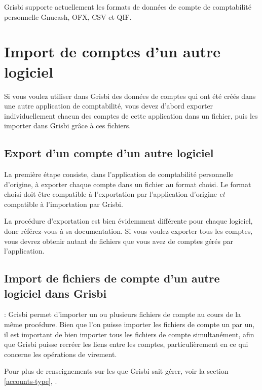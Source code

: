 Grisbi supporte actuellement les formats de données de compte de comptabilité personnelle \gls{Gnucash}, \gls{OFX}, \gls{CSV} et \gls{QIF}.


\section{Import de comptes d'un autre logiciel\label{move-import}}


Si vous voulez utiliser dans Grisbi des données de comptes qui ont été créés dans une autre application de comptabilité, vous devez d'abord exporter individuellement chacun des comptes de cette application dans un fichier, puis les importer dans Grisbi grâce à ces fichiers.


\subsection{Export d'un compte d'un autre logiciel\label{move-import-exportinit}}

La première étape consiste, dans l'application de comptabilité personnelle d'origine, à exporter chaque compte dans un fichier au format choisi. Le format choisi doit être compatible à l'exportation par l'application d'origine \emph{et} compatible à l'importation par Grisbi.

La procédure d'exportation est bien évidemment différente pour chaque logiciel, donc référez-vous à sa documentation. Si vous voulez exporter tous les comptes, vous devrez obtenir autant de fichiers que vous avez de comptes gérés par l'application.


\subsection{Import de fichiers de compte d'un autre logiciel dans Grisbi\label{move-import-importinit}}

\Note{}: Grisbi permet d'importer un ou plusieurs fichiers de compte au cours de la même procédure. Bien que l'on puisse importer les fichiers de compte un par un, il est important de bien importer tous les fichiers de compte simultanément, afin que Grisbi puisse recréer les liens entre les comptes, particulièrement en ce qui concerne les opérations de virement.

Pour plus de renseignements sur les  que Grisbi sait gérer, voir la section \vref{accounts-type}, .

